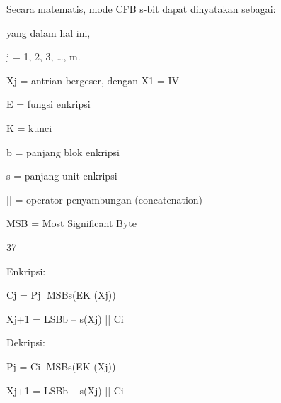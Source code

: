 \documentclass{article}
\begin{document}

Secara matematis, mode CFB s-bit dapat dinyatakan sebagai:

yang dalam hal ini,

j = 1, 2, 3, …, m.

Xj = antrian bergeser, dengan X1 = IV

E = fungsi enkripsi

K = kunci

b = panjang blok enkripsi

s = panjang unit enkripsi

|| = operator penyambungan (concatenation)

MSB = Most Significant Byte

37

Enkripsi:

Cj = Pj MSBs(EK (Xj))

Xj+1 = LSBb – s(Xj) || Ci

Dekripsi:

Pj = Ci MSBs(EK (Xj))

Xj+1 = LSBb – s(Xj) || Ci
\end{document}
